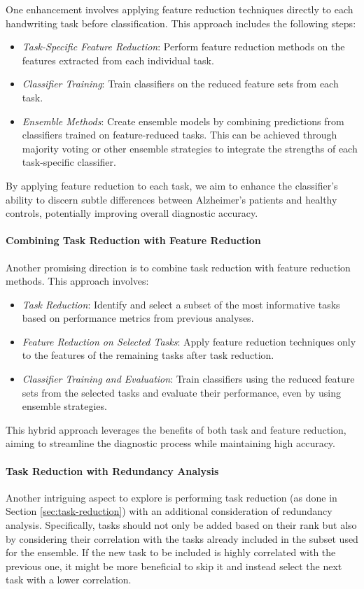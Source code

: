 \documentclass[a4paper, 11pt]{article}
\begin{document}
One enhancement involves applying feature reduction techniques directly to each handwriting task before classification. This approach includes the following steps:
\begin{itemize}
    \item \textit{Task-Specific Feature Reduction}: Perform feature reduction methods on the features extracted from each individual task.
    \item \textit{Classifier Training}: Train classifiers on the reduced feature sets from each task.
    \item \textit{Ensemble Methods}: Create ensemble models by combining predictions from classifiers trained on feature-reduced tasks. This can be achieved through majority voting or other ensemble strategies to integrate the strengths of each task-specific classifier.
\end{itemize}

By applying feature reduction to each task, we aim to enhance the classifier's ability to discern subtle differences between Alzheimer's patients and healthy controls, potentially improving overall diagnostic accuracy.

\paragraph{Combining Task Reduction with Feature Reduction}

Another promising direction is to combine task reduction with feature reduction methods. This approach involves:
\begin{itemize}
    \item \textit{Task Reduction}: Identify and select a subset of the most informative tasks based on performance metrics from previous analyses.
    \item \textit{Feature Reduction on Selected Tasks}: Apply feature reduction techniques only to the features of the remaining tasks after task reduction.
    \item \textit{Classifier Training and Evaluation}: Train classifiers using the reduced feature sets from the selected tasks and evaluate their performance, even by using ensemble strategies. 
\end{itemize}

This hybrid approach leverages the benefits of both task and feature reduction, aiming to streamline the diagnostic process while maintaining high accuracy.

\paragraph{Task Reduction with Redundancy Analysis}
Another intriguing aspect to explore is performing task reduction (as done in Section \ref{sec:task-reduction}) with an additional consideration of redundancy analysis. Specifically, tasks should not only be added based on their rank but also by considering their correlation with the tasks already included in the subset used for the ensemble. If the new task to be included is highly correlated with the previous one, it might be more beneficial to skip it and instead select the next task with a lower correlation.
\end{document}
